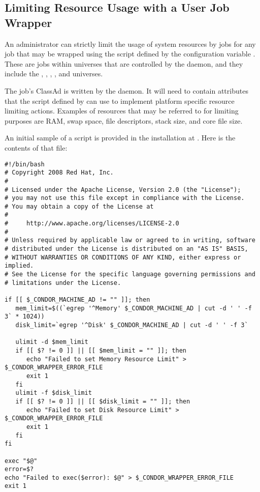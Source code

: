 \subsection{\label{sec:Resource-Limits}Limiting Resource Usage with a User Job Wrapper} 

An administrator can strictly limit the usage of system resources
by jobs for any job that may be wrapped using
the script defined by the configuration variable
.
These are jobs within universes that are controlled by the
 daemon, and they include 
the , , ,
, and  universes.

The job's ClassAd is written by the  daemon.
It will need to contain attributes that the script defined by
 can use to implement 
platform specific resource limiting actions.
Examples of resources that may be referred to for limiting purposes
are RAM, swap space, file descriptors, stack size, and core file size. 

An initial sample of a  script is provided
in the installation at
.
Here is the contents of that file:

\footnotesize
\begin{verbatim}
#!/bin/bash
# Copyright 2008 Red Hat, Inc.
#
# Licensed under the Apache License, Version 2.0 (the "License");
# you may not use this file except in compliance with the License.
# You may obtain a copy of the License at
#
#     http://www.apache.org/licenses/LICENSE-2.0
#
# Unless required by applicable law or agreed to in writing, software
# distributed under the License is distributed on an "AS IS" BASIS,
# WITHOUT WARRANTIES OR CONDITIONS OF ANY KIND, either express or implied.
# See the License for the specific language governing permissions and
# limitations under the License.

if [[ $_CONDOR_MACHINE_AD != "" ]]; then
   mem_limit=$((`egrep '^Memory' $_CONDOR_MACHINE_AD | cut -d ' ' -f 3` * 1024))
   disk_limit=`egrep '^Disk' $_CONDOR_MACHINE_AD | cut -d ' ' -f 3`

   ulimit -d $mem_limit
   if [[ $? != 0 ]] || [[ $mem_limit = "" ]]; then
      echo "Failed to set Memory Resource Limit" > $_CONDOR_WRAPPER_ERROR_FILE
      exit 1
   fi
   ulimit -f $disk_limit
   if [[ $? != 0 ]] || [[ $disk_limit = "" ]]; then
      echo "Failed to set Disk Resource Limit" > $_CONDOR_WRAPPER_ERROR_FILE
      exit 1
   fi
fi

exec "$@"
error=$?
echo "Failed to exec($error): $@" > $_CONDOR_WRAPPER_ERROR_FILE
exit 1
\end{verbatim}
\normalsize

